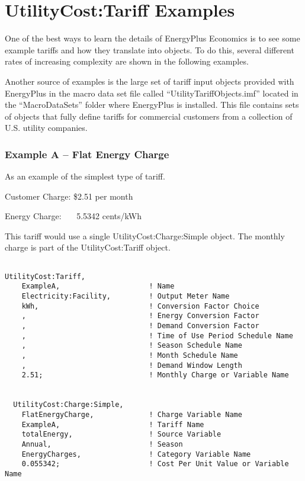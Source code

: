 \section{UtilityCost:Tariff Examples}\label{utilitycosttariff-examples}

One of the best ways to learn the details of EnergyPlus Economics is to see some example tariffs and how they translate into objects. To do this, several different rates of increasing complexity are shown in the following examples.

Another source of examples is the large set of tariff input objects provided with EnergyPlus in the macro data set file called ``UtilityTariffObjects.imf'' located in the ``MacroDataSets'' folder where EnergyPlus is installed. This file contains sets of objects that fully define tariffs for commercial customers from a collection of U.S. utility companies.

\subsubsection{Example A -- Flat Energy Charge}\label{example-a-flat-energy-charge}

As an example of the simplest type of tariff.

Customer Charge: \$2.51 per month

Energy Charge:~~~ 5.5342 cents/kWh

This tariff would use a single UtilityCost:Charge:Simple object. The monthly charge is part of the UtilityCost:Tariff object.

\begin{lstlisting}

UtilityCost:Tariff,
    ExampleA,                     ! Name
    Electricity:Facility,         ! Output Meter Name
    kWh,                          ! Conversion Factor Choice
    ,                             ! Energy Conversion Factor
    ,                             ! Demand Conversion Factor
    ,                             ! Time of Use Period Schedule Name
    ,                             ! Season Schedule Name
    ,                             ! Month Schedule Name
    ,                             ! Demand Window Length
    2.51;                         ! Monthly Charge or Variable Name


  UtilityCost:Charge:Simple,
    FlatEnergyCharge,             ! Charge Variable Name
    ExampleA,                     ! Tariff Name
    totalEnergy,                  ! Source Variable
    Annual,                       ! Season
    EnergyCharges,                ! Category Variable Name
    0.055342;                     ! Cost Per Unit Value or Variable Name
\end{lstlisting}

